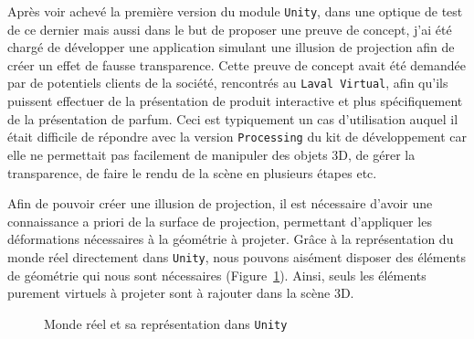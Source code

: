 Après voir achevé la première version du module \texttt{Unity}, dans une optique de test de ce dernier mais aussi dans le but de proposer une preuve de concept, j'ai été chargé de développer une application simulant une illusion de projection afin de créer un effet de fausse transparence. Cette preuve de concept avait été demandée par de potentiels clients de la société, rencontrés au \texttt{Laval Virtual}, afin qu'ils puissent effectuer de la présentation de produit interactive et plus spécifiquement de la présentation de parfum. Ceci est typiquement un cas d'utilisation auquel il était difficile de répondre avec la version \texttt{Processing} du kit de développement car elle ne permettait pas facilement de manipuler des objets 3D, de gérer la transparence, de faire le rendu de la scène en plusieurs étapes etc. 

Afin de pouvoir créer une illusion de projection, il est nécessaire d'avoir une connaissance a priori de la surface de projection, permettant d'appliquer les déformations nécessaires à la géométrie à projeter. Grâce à la représentation du monde réel directement dans \texttt{Unity}, nous pouvons aisément disposer des éléments de géométrie qui nous sont nécessaires (Figure~\ref{fig:realvsunity}). Ainsi, seuls les éléments purement virtuels à projeter sont à rajouter dans la scène 3D.

\begin{figure}[H]
\centering
\caption{Monde réel et sa représentation dans \texttt{Unity}}
\label{fig:realvsunity}
\end{figure}

